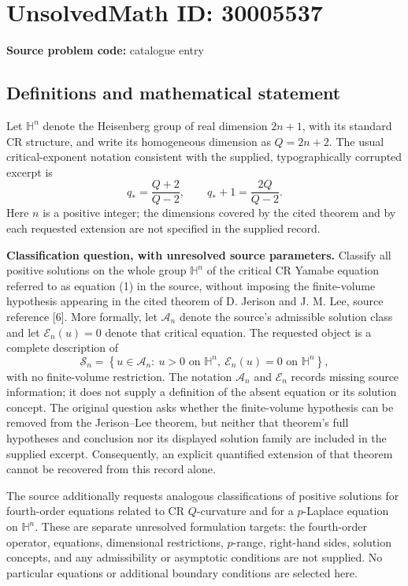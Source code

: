 \documentclass[11pt]{article}
\begin{document}
\section*{UnsolvedMath ID: 30005537}
\textbf{Source problem code:} catalogue entry
\subsection{Definitions and mathematical statement}
Let \(\mathbb H^n\) denote the Heisenberg group of real dimension \(2n+1\), with its standard CR structure, and write its homogeneous dimension as \(Q=2n+2\). The usual critical-exponent notation consistent with the supplied, typographically corrupted excerpt is
\[
q_* = \frac{Q+2}{Q-2},\qquad q_*+1=\frac{2Q}{Q-2}.
\]
Here \(n\) is a positive integer; the dimensions covered by the cited theorem and by each requested extension are not specified in the supplied record.

\textbf{Classification question, with unresolved source parameters.} Classify all positive solutions on the whole group \(\mathbb H^n\) of the critical CR Yamabe equation referred to as equation (1) in the source, without imposing the finite-volume hypothesis appearing in the cited theorem of D. Jerison and J. M. Lee, source reference [6]. More formally, let \(\mathcal A_n\) denote the source's admissible solution class and let \(\mathcal E_n(u)=0\) denote that critical equation. The requested object is a complete description of
\[
\mathcal S_n=\left\{u\in\mathcal A_n:\ u>0\text{ on }\mathbb H^n,\ \mathcal E_n(u)=0\text{ on }\mathbb H^n\right\},
\]
with no finite-volume restriction. The notation \(\mathcal A_n\) and \(\mathcal E_n\) records missing source information; it does not supply a definition of the absent equation or its solution concept. The original question asks whether the finite-volume hypothesis can be removed from the Jerison--Lee theorem, but neither that theorem's full hypotheses and conclusion nor its displayed solution family are included in the supplied excerpt. Consequently, an explicit quantified extension of that theorem cannot be recovered from this record alone.

The source additionally requests analogous classifications of positive solutions for fourth-order equations related to CR \(Q\)-curvature and for a \(p\)-Laplace equation on \(\mathbb H^n\). These are separate unresolved formulation targets: the fourth-order operator, equations, dimensional restrictions, \(p\)-range, right-hand sides, solution concepts, and any admissibility or asymptotic conditions are not supplied. No particular equations or additional boundary conditions are selected here.
\end{document}
